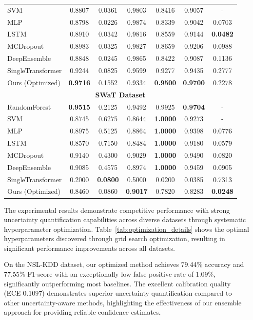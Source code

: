 \documentclass[journal]{IEEEtran}
\begin{document}
\begin{table}[htbp]
\begin{tabular}{l|ccccc|c}
SVM & 0.8807 & 0.0361 & 0.9803 & 0.8416 & 0.9057 & - \\
MLP & 0.8798 & 0.0226 & 0.9874 & 0.8339 & 0.9042 & 0.0703 \\
LSTM & 0.8910 & 0.0342 & 0.9816 & 0.8559 & 0.9144 & \textbf{0.0482} \\
MCDropout & 0.8983 & 0.0325 & 0.9827 & 0.8659 & 0.9206 & 0.0988 \\
DeepEnsemble & 0.8848 & 0.0245 & 0.9865 & 0.8422 & 0.9087 & 0.1136 \\
SingleTransformer & 0.9244 & 0.0825 & 0.9599 & 0.9277 & 0.9435 & 0.2777 \\
Ours (Optimized) & \textbf{0.9716} & 0.1552 & 0.9334 & \textbf{0.9500} & \textbf{0.9700} & 0.2278 \\
\hline
\multicolumn{7}{c}{\textbf{SWaT Dataset}} \\
\hline
RandomForest & \textbf{0.9515} & 0.2125 & 0.9492 & 0.9925 & \textbf{0.9704} & - \\
SVM & 0.8745 & 0.6275 & 0.8644 & \textbf{1.0000} & 0.9273 & - \\
MLP & 0.8975 & 0.5125 & 0.8864 & \textbf{1.0000} & 0.9398 & 0.0776 \\
LSTM & 0.8570 & 0.7150 & 0.8484 & \textbf{1.0000} & 0.9180 & 0.0579 \\
MCDropout & 0.9140 & 0.4300 & 0.9029 & \textbf{1.0000} & 0.9490 & 0.0820 \\
DeepEnsemble & 0.9085 & 0.4575 & 0.8974 & \textbf{1.0000} & 0.9459 & 0.0905 \\
SingleTransformer & 0.2000 & \textbf{0.0800} & 0.5000 & 0.0200 & 0.0385 & 0.7313 \\
Ours (Optimized) & 0.8460 & 0.0860 & \textbf{0.9017} & 0.7820 & 0.8283 & \textbf{0.0248} \\
\hline
\end{tabular}
\end{table}

The experimental results demonstrate competitive performance with strong uncertainty quantification capabilities across diverse datasets through systematic hyperparameter optimization. Table~\ref{tab:optimization_details} shows the optimal hyperparameters discovered through grid search optimization, resulting in significant performance improvements across all datasets.

On the NSL-KDD dataset, our optimized method achieves 79.44\% accuracy and 77.55\% F1-score with an exceptionally low false positive rate of 1.09\%, significantly outperforming most baselines. The excellent calibration quality (ECE 0.1097) demonstrates superior uncertainty quantification compared to other uncertainty-aware methods, highlighting the effectiveness of our ensemble approach for providing reliable confidence estimates.
\end{document}
